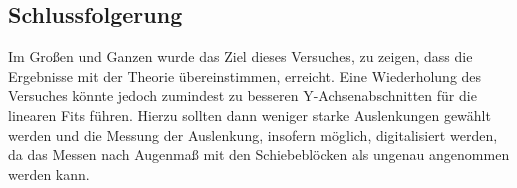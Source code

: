 	\subsection{Schlussfolgerung}
	
		Im Großen und Ganzen wurde das Ziel dieses Versuches, zu zeigen, dass die Ergebnisse mit der Theorie übereinstimmen, erreicht. Eine Wiederholung des Versuches könnte jedoch zumindest zu besseren Y-Achsenabschnitten für die linearen Fits führen. Hierzu sollten dann weniger starke Auslenkungen gewählt werden und die Messung der Auslenkung, insofern möglich, digitalisiert werden, da das Messen nach Augenmaß mit den Schiebeblöcken als ungenau angenommen werden kann.